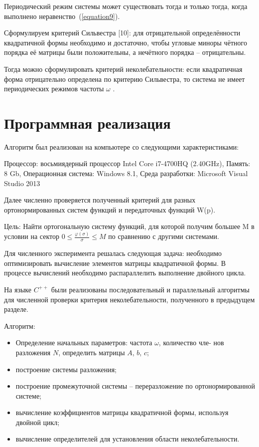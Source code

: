 \documentclass{spisok-article}
\begin{document}
Периодический режим системы может существовать тогда и только тогда, когда выполнено неравенство~(\ref{equation9}).

Сформулируем критерий Сильвестра [10]: для отрицательной определённости квадратичной формы необходимо и достаточно, чтобы угловые миноры чётного порядка её матрицы были положительны, а нечётного порядка -- отрицательны.

Тогда можно сформулировать критерий неколебательности: если квадратичная форма отрицательно определена по критерию Сильвестра, то система не имеет периодических режимов частоты $\omega$ .

\section{Программная реализация}

Алгоритм был реализован на компьютере со следующими характеристиками:

Процессор: восьмиядерный процессор Intel Core i7-4700HQ (2.40GHz), Память: 8 Gb, Операционная система: Windows 8.1, Среда разработки: Microsoft Visual Studio 2013

Далее численно проверяется полученный критерий для разных ортонормированных систем функций и передаточных функций W(p).

Цель: Найти ортогональную систему функций, для которой получим большее M в условии на сектор $ 0 \leq \frac{\varphi(\sigma)}{\sigma} \leq M $ по сравнению с другими системами.

Для численного эксперимента решалась следующая задача: необходимо оптимизировать вычисление элементов матрицы квадратичной формы. В процессе вычислений необходимо распараллелить выполнение двойного цикла.

На языке $C^{++}$ были реализованы последовательный и параллельный алгоритмы для численной проверки критерия неколебательности, полученного
в предыдущем разделе.
\bigskip

Алгоритм:
\begin{itemize}
\item
Определение начальных параметров: частота $\omega$, количество чле-
нов разложения $N$, определить матрицы $A$, $b$, $c$;

\item
построение системы разложения;

\item
построение промежуточной системы -- переразложение по ортонормированной системе;

\item
вычисление коэффициентов матрицы квадратичной формы, используя двойной цикл;

\item
вычисление определителей для установления области неколебательности.
\end{itemize}
\end{document}
